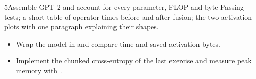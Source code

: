 \begin{labbox}{5}{Assemble GPT-2 and account for every parameter, FLOP and byte}
Passing tests; a short table of operator times before and after fusion; the two activation plots
with one paragraph explaining their shapes.

\begin{itemize}
\item Wrap the model in  and compare time and saved-activation bytes.
\item Implement the chunked cross-entropy of the last exercise and measure peak memory with
  .
\end{itemize}
\end{labbox}
